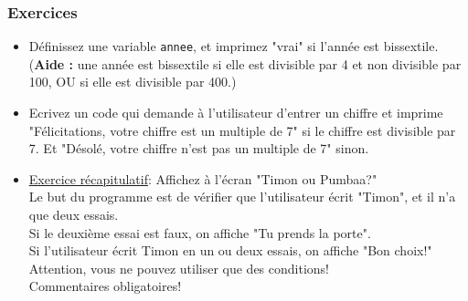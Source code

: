 \subsubsection{Exercices}
    \begin{itemize}
	\item Définissez une variable \texttt{annee}, et imprimez "vrai" si l'année est bissextile. (\textbf{Aide :} une année est bissextile si elle est divisible par 4 et non divisible par 100, OU si elle est divisible par 400.)
	\item Ecrivez un code qui demande à l'utilisateur d'entrer un chiffre et imprime "Félicitations, votre chiffre est un multiple de 7" si le chiffre est divisible par 7. Et "Désolé, votre chiffre n'est pas un multiple de 7" sinon.
	\item \underline{Exercice récapitulatif}:     Affichez à l'écran "Timon ou Pumbaa?"\\
	Le but du programme est de vérifier que l'utilisateur écrit "Timon", et il n'a que deux essais.\\
	Si le deuxième essai est faux, on affiche "Tu prends la porte".\\
	Si l'utilisateur écrit Timon en un ou deux essais, on affiche "Bon choix!"\\
	Attention, vous ne pouvez utiliser que des conditions!\\
	Commentaires obligatoires!
\end{itemize}